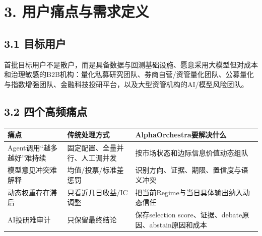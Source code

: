 \documentclass[12pt,a4paper]{ctexart}
\begin{document}
\section{\texorpdfstring{\textbf{3.
用户痛点与需求定义}}{3. 用户痛点与需求定义}}\label{ux7528ux6237ux75dbux70b9ux4e0eux9700ux6c42ux5b9aux4e49}

\subsection{\texorpdfstring{\textbf{3.1
目标用户}}{3.1 目标用户}}\label{ux76eeux6807ux7528ux6237}

首批目标用户不是散户，而是具备数据与回测基础设施、愿意采用大模型但对成本和治理敏感的B2B机构：量化私募研究团队、券商自营/资管量化团队、公募量化与指数增强团队、金融科技投研平台，以及大型资管机构的AI/模型风险团队。

\subsection{\texorpdfstring{\textbf{3.2
四个高频痛点}}{3.2 四个高频痛点}}\label{ux56dbux4e2aux9ad8ux9891ux75dbux70b9}

\begin{longtable}[]{@{}
  >{\raggedright\arraybackslash}p{}
  >{\raggedright\arraybackslash}p{}
  >{\raggedright\arraybackslash}p{}@{}}
\toprule\noalign{}
\begin{minipage}[b]{\linewidth}\centering
\textbf{痛点}
\end{minipage} & \begin{minipage}[b]{\linewidth}\centering
\textbf{传统处理方式}
\end{minipage} & \begin{minipage}[b]{\linewidth}\centering
\textbf{AlphaOrchestra要解决什么}
\end{minipage} \\
\midrule\noalign{}
\endhead
\bottomrule\noalign{}
\endlastfoot
Agent调用``越多越好''难持续 & 固定配置、全量并行、人工调并发 &
按市场状态和边际信息价值动态组队 \\
模型意见冲突难解释 & 均值/投票/标准差惩罚 &
识别方向、证据、期限、置信度与语义冲突 \\
动态权重存在滞后 & 只看近几日收益/IC调整 &
把当前Regime与当日具体输出纳入动态信任 \\
AI投研难审计 & 只保留最终结论 & 保存selection
score、证据、debate原因、abstain原因和成本 \\
\end{longtable}
\end{document}
